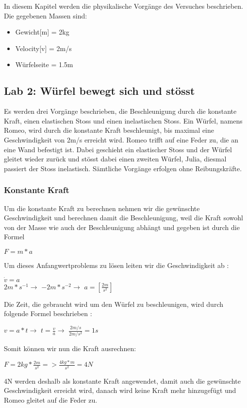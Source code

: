 \documentclass[../main.tex]{subfiles}
\begin{document}
In diesem Kapitel werden die physikalische Vorgänge des Versuches beschrieben. 
Die gegebenen Massen sind:
\begin{itemize}
	\item Gewicht[m] = 2kg
	\item Velocity[v] = 2m/s
	\item Würfelseite = 1.5m
\end{itemize}
\subsection{Lab 2: Würfel bewegt sich und stösst}
Es werden drei Vorgänge beschrieben, die Beschleunigung durch die konstante Kraft, einen elastischen Stoss und einen inelastischen Stoss.
Ein Würfel, namens Romeo, wird durch die konstante Kraft beschleunigt, bis maximal eine Geschwindigkeit von 2m/s erreicht wird.
Romeo trifft auf eine Feder zu, die an eine Wand befestigt ist.
Dabei geschieht ein elastischer Stoss und der Würfel gleitet wieder zurück und stösst dabei einen zweiten Würfel,
Julia, diesmal passiert der Stoss inelastisch. Sämtliche Vorgänge erfolgen ohne Reibungskräfte.
\subsubsection{Konstante Kraft}
Um die konstante Kraft zu berechnen nehmen wir die gewünschte Geschwindigkeit und berechnen damit die Beschleunigung,
weil die Kraft sowohl von der Masse wie auch der Beschleunigung abhängt und
gegeben ist durch die Formel\cite{tiplerpaula.PhysikFurStudierende}
\begin{mdframed}
		 $F = m*a$
\end{mdframed}
Um dieses Anfangwertproblems zu lösen leiten wir die Geschwindigkeit ab \cite{tiplerpaula.PhysikFurStudierende}:
\begin{mdframed}
		 $\dot{v} = a$\\
$2m*s^{-1} \rightarrow$  $-2m*s^{-2} \rightarrow$  $a = [\frac{2m}{s^{2}}]$
\end{mdframed}
Die Zeit, die gebraucht wird um den Würfel zu beschleunigen, wird durch folgende Formel
beschrieben \cite{tiplerpaula.PhysikFurStudierende}:
\begin{mdframed}
 $v=a*t \rightarrow$ $t=\frac{v}{a} \rightarrow$ $\frac{2m/s}{2m/s^{2}} = 1s$
\end{mdframed}
Somit können wir nun die Kraft ausrechnen:
\begin{mdframed}
$F = 2kg * \frac{2m}{s^{2}} => \frac{4kg*m}{s^{2}} = 4N$
\end{mdframed}
4N werden deshalb als konstante Kraft angewendet, damit auch die gewünschte Geschwindigkeit
erreicht wird, danach wird keine Kraft mehr hinzugefügt und Romeo gleitet auf die Feder zu.
\newpage
\end{document}
